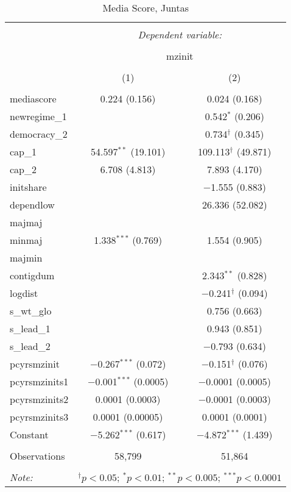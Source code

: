 
\begin{table}[!htbp] \centering 
  \caption{Media Score, Juntas} 
  \label{} 
\begin{tabular}{@{\extracolsep{5pt}}lcc} 
\\[-1.8ex]\hline 
\hline \\[-1.8ex] 
 & \multicolumn{2}{c}{\textit{Dependent variable:}} \\ 
\cline{2-3} 
\\[-1.8ex] & \multicolumn{2}{c}{mzinit} \\ 
\\[-1.8ex] & (1) & (2)\\ 
\hline \\[-1.8ex] 
 mediascore & 0.224 (0.156) & 0.024 (0.168) \\ 
  newregime\_1 &  & 0.542$^{*}$ (0.206) \\ 
  democracy\_2 &  & 0.734$^{\dagger}$ (0.345) \\ 
  cap\_1 & 54.597$^{**}$ (19.101) & 109.113$^{\dagger}$ (49.871) \\ 
  cap\_2 & 6.708 (4.813) & 7.893 (4.170) \\ 
  initshare &  & $-$1.555 (0.883) \\ 
  dependlow &  & 26.336 (52.082) \\ 
  majmaj &  &  \\ 
  minmaj & 1.338$^{***}$ (0.769) & 1.554 (0.905) \\ 
  majmin &  &  \\ 
  contigdum &  & 2.343$^{**}$ (0.828) \\ 
  logdist &  & $-$0.241$^{\dagger}$ (0.094) \\ 
  s\_wt\_glo &  & 0.756 (0.663) \\ 
  s\_lead\_1 &  & 0.943 (0.851) \\ 
  s\_lead\_2 &  & $-$0.793 (0.634) \\ 
  pcyrsmzinit & $-$0.267$^{***}$ (0.072) & $-$0.151$^{\dagger}$ (0.076) \\ 
  pcyrsmzinits1 & $-$0.001$^{***}$ (0.0005) & $-$0.0001 (0.0005) \\ 
  pcyrsmzinits2 & 0.0001 (0.0003) & $-$0.0001 (0.0003) \\ 
  pcyrsmzinits3 & 0.0001 (0.00005) & 0.0001 (0.0001) \\ 
  Constant & $-$5.262$^{***}$ (0.617) & $-$4.872$^{***}$ (1.439) \\ 
 \hline \\[-1.8ex] 
Observations & 58,799 & 51,864 \\ 
\hline 
\hline \\[-1.8ex] 
\textit{Note:}  & \multicolumn{2}{r}{$^{\dagger} p<0.05$; $^{*} p<0.01$; $^{**} p<0.005$; $^{***} p<0.0001$} \\ 
\end{tabular} 
\end{table} 
